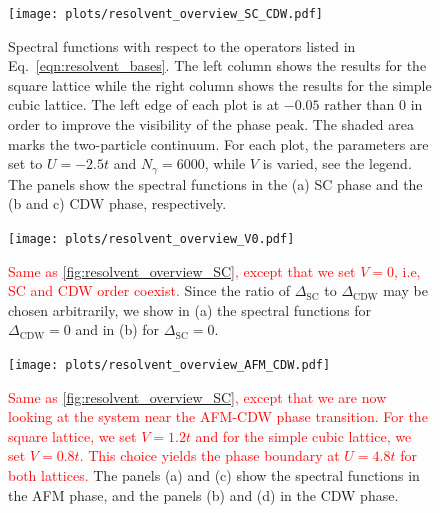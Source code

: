 \documentclass[
    reprint, 
    aps,
    preprintnumbers,
    twocolumn,
    prb,
    superscriptaddress
]{revtex4-2}
\newcommand{\markEdited}{red}
\begin{document}

\begin{figure}
    \centering
    \texttt{[image: plots/resolvent\_overview\_SC\_CDW.pdf]}
    \caption{Spectral functions with respect to the operators listed in Eq.~\eqref{eqn:resolvent_bases}.
    The left column shows the results for the square lattice while the right column shows the results for the simple cubic lattice.
    The left edge of each plot is at $-0.05$ rather than $0$ in order to improve the visibility of the phase peak.
    The shaded area marks the two-particle continuum.
    For each plot, the parameters are set to $U=-2.5t$ and $N_\gamma = 6000$, while $V$ is varied, see the legend.
    The panels show the spectral functions in the (a) SC phase and the (b and c) CDW phase, respectively.}
    \label{fig:resolvent_overview_SC}
\end{figure}

\begin{figure}
    \centering
    \texttt{[image: plots/resolvent\_overview\_V0.pdf]}
    \caption{\textcolor{\markEdited}{Same as \autoref{fig:resolvent_overview_SC}, except that we set $V=0$, i.e, SC and CDW order coexist.}
    Since the ratio of $\Delta_\text{SC}$ to $\Delta_\text{CDW}$ may be chosen arbitrarily, we show in (a) the spectral functions for $\Delta_\text{CDW} = 0$ and in (b) for $\Delta_\text{SC} = 0$.}
    \label{fig:resolvent_overview_V0}
\end{figure}

\begin{figure}
    \centering
    \texttt{[image: plots/resolvent\_overview\_AFM\_CDW.pdf]}
    \caption{\textcolor{\markEdited}{Same as \autoref{fig:resolvent_overview_SC}, except that we are now looking at the system near the AFM-CDW phase transition.
    For the square lattice, we set $V=1.2t$ and for the simple cubic lattice, we set $V=0.8t$. This choice yields the phase boundary at $U=4.8t$ for both lattices.}
    The panels (a) and (c) show the spectral functions in the AFM phase, and the panels (b) and (d) in the CDW phase.}
    \label{fig:resolvent_overview_AFM}
\end{figure}
\end{document}
